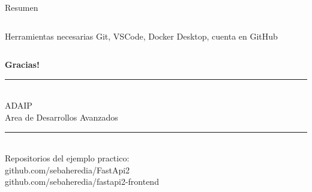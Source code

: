 \documentclass[aspectratio=169]{beamer}
\begin{document}
\begin{frame}{Resumen}
\begin{columns}
    \vspace{0.1cm}
    \begin{alertblock}{Herramientas necesarias}
      Git, VSCode, Docker Desktop, cuenta en GitHub
    \end{alertblock}
  \end{columns}
\end{frame}

{
\begin{frame}[plain]
  \begin{center}
    \vspace{2cm}
    {\color{white}\Huge\textbf{Gracias!}}\\[0.5cm]
    \rule{6cm}{0.4pt}\\[0.5cm]
    {\color{gris}\large ADAIP}\\[0.2cm]
    {\color{gris}\small Area de Desarrollos Avanzados}\\[1cm]
    \rule{6cm}{0.4pt}\\[0.5cm]
    {\color{azulclaro}\small Repositorios del ejemplo practico:}\\[0.2cm]
    {\color{white}\small github.com/sebaheredia/FastApi2}\\
    {\color{white}\small github.com/sebaheredia/fastapi2-frontend}
  \end{center}
\end{frame}
}
\end{document}
